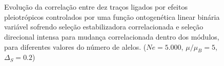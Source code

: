 \begin{figure}[htbp]
  \\
  \vspace{-18pt}
  \vspace{11pt}
  \\
  \caption{Evolução da correlação entre dez traços ligados por efeitos
  pleiotrópicos controlados por uma função ontogenética linear binária
  variável sofrendo seleção estabilizadora correlacionada e seleção
  direcional intensa para mudança correlacionada dentro dos módulos,
  para diferentes valores do número de alelos. ($Ne=5.000$, $\mu/\mu_B=5$, $\Delta_S=0.2$)}
  \label{MB}
\end{figure}
